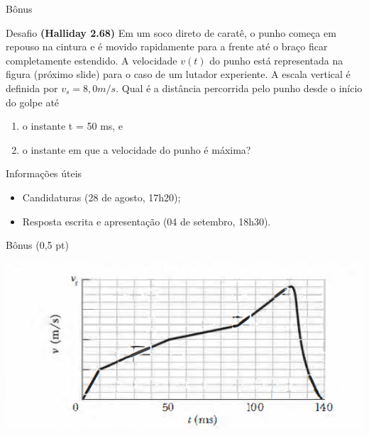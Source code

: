 \documentclass[xcolor=dvipsnames,table]{beamer}
\begin{document}
	\begin{frame}[shrink]{Bônus}
		\begin{block}{Desafio}
			{\bf (Halliday 2.68)} Em um soco direto de caratê, o punho começa em repouso na cintura e é movido rapidamente para a frente até o braço ficar completamente estendido. A velocidade $v(t)$ do punho está representada na figura (próximo slide) para o caso de um lutador experiente. A escala vertical é definida por $v_s = 8,0 m/s$. Qual é a distância percorrida pelo punho desde o início do golpe até
			\begin{enumerate}
				\item o instante t = 50 ms, e 
				\item o instante em que a velocidade do punho é máxima?
			\end{enumerate} 
		\end{block} \pause
		\begin{block}{Informações úteis}
			\begin{itemize}
                \item Candidaturas (28 de agosto, 17h20);
                \item Resposta escrita e apresentação (04 de setembro, 18h30).
			\end{itemize}
		\end{block} 
	\end{frame}
	
	\begin{frame}{Bônus (0,5 pt)}
		\begin{center}
			\includegraphics[scale=0.5]{images/bonus.png}
		\end{center}
	\end{frame}
	
	\begin{frame}
		\titlepage
	\end{frame}
	
\end{document}

